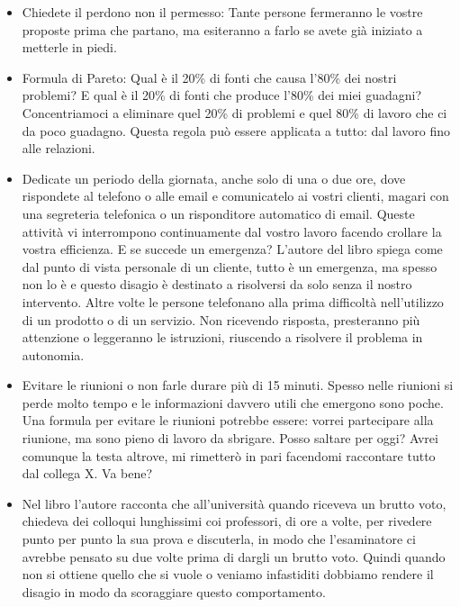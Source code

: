 \documentclass[12pt]{book} %
\begin{document}
\begin{itemize}
\item Chiedete il perdono non il permesso: Tante persone fermeranno le vostre proposte prima che partano, ma esiteranno
a farlo se avete già iniziato a metterle in piedi.
\item Formula di Pareto: Qual è il 20\% di fonti che causa l'80\% dei nostri problemi? E qual è il
20\% di fonti che produce l'80\% dei miei guadagni? Concentriamoci a eliminare quel 20\% di
problemi e quel 80\% di lavoro che ci da poco guadagno. Questa regola può essere applicata a tutto: dal lavoro fino
alle relazioni.
\item Dedicate un periodo della giornata, anche solo di una o due ore, dove rispondete al telefono o alle email e
comunicatelo ai vostri clienti, magari con una segreteria telefonica o un risponditore automatico di email. Queste
attività vi interrompono continuamente dal vostro lavoro facendo crollare la vostra efficienza. E se succede un
emergenza? L'autore del libro spiega come dal punto di vista personale di un cliente, tutto è un
emergenza, ma spesso non lo è e questo disagio è destinato a risolversi da solo senza il nostro intervento. Altre volte
le persone telefonano alla prima difficoltà nell'utilizzo di un prodotto o di un servizio. Non
ricevendo risposta, presteranno più attenzione o leggeranno le istruzioni, riuscendo a risolvere il problema in
autonomia.
\item Evitare le riunioni o non farle durare più di 15 minuti. Spesso nelle riunioni si perde molto tempo e le
informazioni davvero utili che emergono sono poche. Una formula per evitare le riunioni potrebbe essere: vorrei
partecipare alla riunione, ma sono pieno di lavoro da sbrigare. Posso saltare per oggi? Avrei comunque la testa
altrove, mi rimetterò in pari facendomi raccontare tutto dal collega X. Va bene?
\item Nel libro l'autore racconta che all'università quando riceveva un brutto voto, chiedeva dei colloqui lunghissimi
coi professori, di ore a volte, per rivedere punto per punto la sua prova e discuterla, in modo che l'esaminatore ci
avrebbe pensato su due volte prima di dargli un brutto voto. Quindi quando non si ottiene quello che si vuole o veniamo
infastiditi dobbiamo rendere il disagio in modo da scoraggiare questo comportamento.
\end{itemize}
\end{document}
